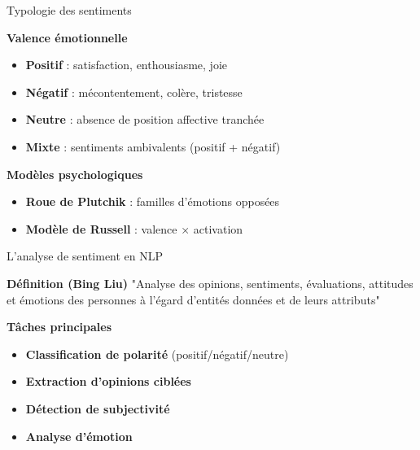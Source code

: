 \begin{frame}{Typologie des sentiments}
    \begin{block}{\centering \textbf{Valence émotionnelle}}
        \begin{itemize}
            \setlength\itemsep{0.6em}
            \item \textbf{Positif} : satisfaction, enthousiasme, joie
            \item \textbf{Négatif} : mécontentement, colère, tristesse  
            \item \textbf{Neutre} : absence de position affective tranchée
            \item \textbf{Mixte} : sentiments ambivalents (positif + négatif)
        \end{itemize}
    \end{block}
    
    \vspace{0.3cm}
    
    \begin{exampleblock}{\centering \textbf{Modèles psychologiques}}
        \begin{itemize}
            \item \textbf{Roue de Plutchik} : familles d'émotions opposées
            \item \textbf{Modèle de Russell} : valence × activation
        \end{itemize}
    \end{exampleblock}
\end{frame}

\begin{frame}{L'analyse de sentiment en NLP}
    \begin{block}{\centering \textbf{Définition (Bing Liu)}}
        \centering
        "Analyse des opinions, sentiments, évaluations, attitudes et émotions des personnes à l'égard d'entités données et de leurs attributs"
    \end{block}
    
    \vspace{0.3cm}
    
    \begin{block}{\centering \textbf{Tâches principales}}
        \begin{itemize}
            \setlength\itemsep{0.5em}
            \item \textbf{Classification de polarité} (positif/négatif/neutre)
            \item \textbf{Extraction d'opinions ciblées}
            \item \textbf{Détection de subjectivité}
            \item \textbf{Analyse d'émotion}
        \end{itemize}
    \end{block}
\end{frame}

